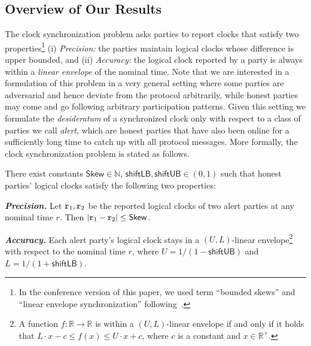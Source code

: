 \subsection{Overview of Our Results}
\label{subsec:results-overview}

The clock synchronization problem asks parties to report clocks that satisfy two properties\footnote{In the conference version of this paper, we used term ``bounded skews'' and ``linear envelope synchronization'' following~\cite{JCSS:DHS86}.}
%
(i) \emph{Precision:} the parties maintain logical clocks whose difference is upper bounded, and (ii) \emph{Accuracy:} the logical clock reported by a party is always within a \emph{linear envelope} of the nominal time.
%
Note that we are interested in a formulation of this problem in a very general setting where some parties are adversarial and hence deviate from the protocol arbitrarily, while honest parties may come and go following arbitrary participation patterns.
%
Given this setting we formulate the \emph{desideratum} of a synchronized clock only with respect to a class of parties we call \emph{alert}, which are honest parties that have also been online for a sufficiently long time to catch up with all protocol messages.
%
More formally, the clock synchronization problem is stated as follows.

\begin{definition}
    \label{def:clock-properties}

    There exist constants $\mathsf{Skew}\in \mathbb{N}$, $\mathsf{shiftLB},\mathsf{shiftUB}\in (0,1)$ such that honest parties' logical clocks satisfy the following two properties:
    \begin{cccItemize}[nosep]
        \item \emph{\textbf{Precision.}}
        Let $\mathtt{r}_1, \mathtt{r}_2$ be the reported logical clocks of two alert parties at any nominal time $r$.
        Then $|\mathtt{r}_ 1 - \mathtt{r}_2| \le \mathsf{Skew}$.

        \item \emph{\textbf{Accuracy.}}
        Each alert party's logical clock stays in a $(U, L)$-linear envelope\footnote{A function $f: \mathbb{R} \rightarrow \mathbb{R}$ is within a $(U, L)$-linear envelope if and only if it holds that $L \cdot x - c \leq f(x) \leq U \cdot x + c$, where $c$ is a constant and $x \in \mathbb{R}^+$.} with respect to the nominal time $r$, where $U = 1 / (1 - \mathsf{shiftUB})$ and $L = 1 / (1 + \mathsf{shiftLB})$.
    \end{cccItemize}
\end{definition}

